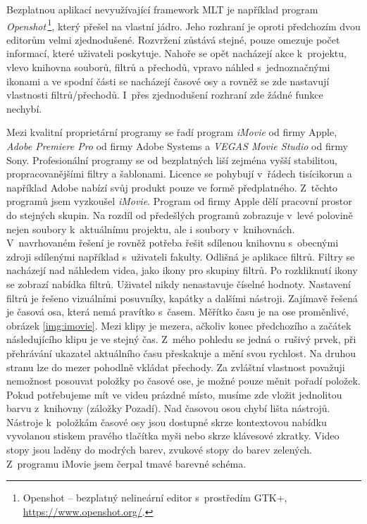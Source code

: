 Bezplatnou aplikací nevyužívající framework MLT je například program \textit{Openshot}\,\footnote{Openshot -- bezplatný nelineární editor s~prostředím GTK+, \url{https://www.openshot.org/}.}, který přešel na vlastní jádro. Jeho rozhraní je oproti předchozím dvou editorům velmi zjednodušené. Rozvržení zůstává stejné, pouze omezuje počet informací, které uživateli poskytuje. Nahoře se opět nacházejí akce k~projektu, vlevo knihovna souborů, filtrů a přechodů, vpravo náhled s~jednoznačnými ikonami a ve spodní části se nacházejí časové osy a rovněž se zde nastavují vlastnosti filtrů/přechodů. I~přes zjednodušení rozhraní zde žádné funkce nechybí.

Mezi kvalitní proprietární programy se řadí program \textit{iMovie} od firmy Apple, \textit{Adobe Premiere Pro} od firmy Adobe Systems a \textit{VEGAS Movie Studio} od firmy Sony. Profesionální programy se od bezplatných liší zejména vyšší stabilitou, propracovanějšími filtry a šablonami. Licence se pohybují v~řádech tisícikorun a například Adobe nabízí svůj produkt pouze ve formě předplatného. Z~těchto programů jsem vyzkoušel \textit{iMovie}. Program od firmy Apple dělí pracovní prostor do stejných skupin. Na rozdíl od předešlých programů zobrazuje v~levé polovině nejen soubory k~aktuálnímu projektu, ale i soubory v~knihovnách. V~navrhovaném řešení je rovněž potřeba řešit sdílenou knihovnu s~obecnými zdroji sdílenými například s~uživateli fakulty. Odlišná je aplikace filtrů. Filtry se nacházejí nad náhledem videa, jako ikony pro skupiny filtrů. Po rozkliknutí ikony se zobrazí nabídka filtrů. Uživatel nikdy nenastavuje číselné hodnoty. Nastavení filtrů je řešeno vizuálními posuvníky, kapátky a dalšími nástroji. Zajímavě řešená je časová osa, která nemá pravítko s~časem. Měřítko času je na ose proměnlivé, obrázek \ref{img:imovie}. Mezi klipy je mezera, ačkoliv konec předchozího a začátek následujícího klipu je ve stejný čas. Z~mého pohledu se jedná o~rušivý prvek, při přehrávání ukazatel aktuálního času přeskakuje a mění svou rychlost. Na druhou stranu lze do mezer pohodlně vkládat přechody. Za zvláštní vlastnost považuji nemožnost posouvat položky po časové ose, je možné pouze měnit pořadí položek. Pokud potřebujeme mít ve videu prázdné místo, musíme zde vložit jednolitou barvu z~knihovny (záložky Pozadí). Nad časovou osou chybí lišta nástrojů. Nástroje k~položkám časové osy jsou dostupné skrze kontextovou nabídku vyvolanou stiskem pravého tlačítka myši nebo skrze klávesové zkratky. Video stopy jsou laděny do modrých barev, zvukové stopy do barev zelených. Z~programu iMovie jsem čerpal tmavé barevné schéma.
